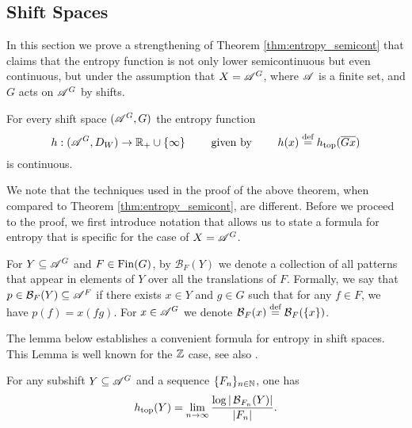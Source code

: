 
\subsection{Shift Spaces}\label{subsection:entropy_cont_shif}
In this section we prove a strengthening of Theorem \ref{thm:entropy_semicont} that claims that the entropy function is not only lower semicontinuous but even continuous, but under the assumption that $X=\mathscr{A}^G$, where $\mathscr{A}$ is a finite set, and $G$ acts on $\mathscr{A}^G$ by shifts. 
\begin{thm}\label{thm:shift_entropy_cont}
For every shift space $(\mathscr{A}^G, G)$ the entropy function
\[
h:(\mathscr{A}^G,D_W)\to \mathbb{R}_{+}\cup\{\infty\} ~~~~~~\text{ given by } ~~~~~~ h(x)\stackrel{\textup{def}}{=} h_\mathrm{top}(\overline{Gx})
\] 
is continuous.
\end{thm}
\noindent 
We note that the techniques used in the proof of the above theorem, when compared to Theorem \ref{thm:entropy_semicont}, are different.
\noindent
Before we proceed to the proof, we first introduce notation that allows us to state a formula for entropy that is specific for the case of $X=\mathscr{A}^G$.

\begin{defn}\label{def:patterns_over_F}
For $Y\subseteq \mathscr{A}^G$ and $F\in\operatorname{Fin}(G)$, by $\mathcal B_{F}(Y)$ we denote a collection of all patterns that appear in elements of $Y$ over all the translations of $F$. Formally, we say that $p\in \mathcal B_{F}(Y)\subseteq \mathscr{A}^{F}$ if there exists $x\in Y$ and $g\in G$ such that for any $f\in F$, we have $p(f) = x(fg)$. For $x\in\mathscr{A}^G$ we denote $\operatorname{\mathcal{B}}_{F}(x)\stackrel{\textup{def}}{=}\operatorname{\mathcal{B}}_{F}(\{x\})$.
\end{defn}

\noindent 
The lemma below establishes a convenient formula for entropy in shift spaces. This Lemma is well known for the $\mathbb{Z}$ case, see also \cite{CC10}.
\begin{lem}\label{lem:subshift_entropy}
For any subshift $Y\subseteq \mathscr{A}^G$ and a \Folner sequence $\{F_n\}_{n\in\mathbb{N}}$, one has
\begin{equation}\label{eq:shift_entropy}
h_\mathrm{top}(Y)=\lim_{n\to\infty}\frac{\log|\operatorname{\mathcal{B}}_{F_n}(Y)|}{|F_n|}.
\end{equation}
\end{lem}

